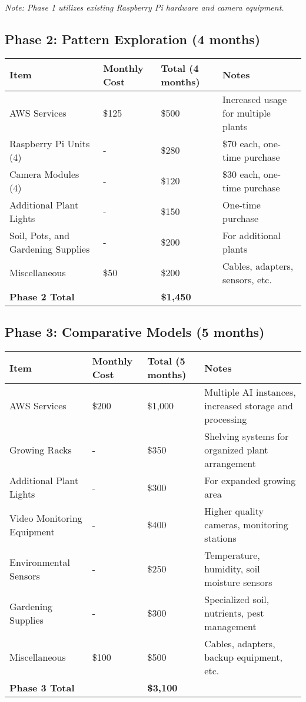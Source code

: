 \documentclass[12pt,letterpaper]{article}
\begin{document}
\textit{Note: Phase 1 utilizes existing Raspberry Pi hardware and camera equipment.}

\subsection{Phase 2: Pattern Exploration (4 months)}
\begin{table}[H]
\centering
\begin{tabular}{@{}llll@{}}
\toprule
\textbf{Item} & \textbf{Monthly Cost} & \textbf{Total (4 months)} & \textbf{Notes} \\
\midrule
AWS Services & \$125 & \$500 & Increased usage for multiple plants \\
Raspberry Pi Units (4) & - & \$280 & \$70 each, one-time purchase \\
Camera Modules (4) & - & \$120 & \$30 each, one-time purchase \\
Additional Plant Lights & - & \$150 & One-time purchase \\
Soil, Pots, and Gardening Supplies & - & \$200 & For additional plants \\
Miscellaneous & \$50 & \$200 & Cables, adapters, sensors, etc. \\
\midrule
\textbf{Phase 2 Total} & & \textbf{\$1,450} & \\
\bottomrule
\end{tabular}
\end{table}

\subsection{Phase 3: Comparative Models (5 months)}
\begin{table}[H]
\centering
\begin{tabular}{@{}llll@{}}
\toprule
\textbf{Item} & \textbf{Monthly Cost} & \textbf{Total (5 months)} & \textbf{Notes} \\
\midrule
AWS Services & \$200 & \$1,000 & Multiple AI instances, increased storage and processing \\
Growing Racks & - & \$350 & Shelving systems for organized plant arrangement \\
Additional Plant Lights & - & \$300 & For expanded growing area \\
Video Monitoring Equipment & - & \$400 & Higher quality cameras, monitoring stations \\
Environmental Sensors & - & \$250 & Temperature, humidity, soil moisture sensors \\
Gardening Supplies & - & \$300 & Specialized soil, nutrients, pest management \\
Miscellaneous & \$100 & \$500 & Cables, adapters, backup equipment, etc. \\
\midrule
\textbf{Phase 3 Total} & & \textbf{\$3,100} & \\
\bottomrule
\end{tabular}
\end{table}
\end{document}

